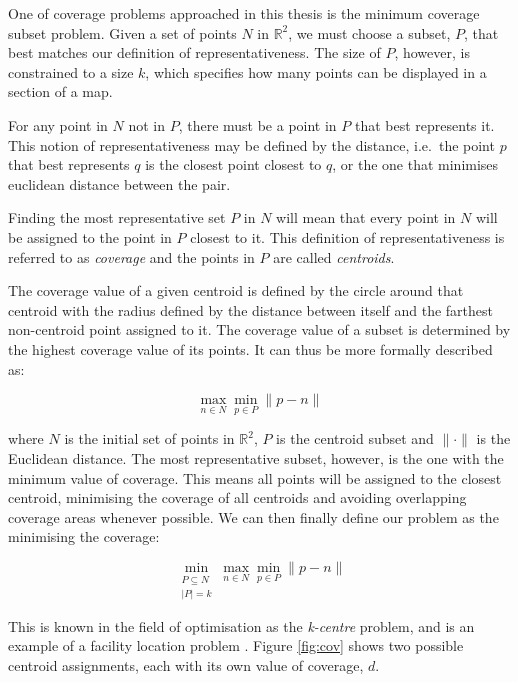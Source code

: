 One of coverage problems approached in this thesis is the minimum coverage subset problem. Given a set of points $N$ in $\mathbb{R}^2$, we must choose a subset, $P$, that best matches our definition of representativeness.
The size of $P$, however, is constrained to a size $k$, which specifies how many points can be displayed in a section of a map.

For any point in $N$ not in $P$, there must be a point in $P$ that best represents it. This notion of representativeness may be defined by the distance, i.e.\ the point $p$ that best represents $q$ is the closest point closest to $q$, or the one that minimises euclidean distance between the pair.

Finding the most representative set $P$ in $N$ will mean that every point in $N$ will be assigned to the point in $P$ closest to it. This definition of representativeness is referred to as \emph{coverage} and the points in $P$ are called \emph{centroids}.

The coverage value of a given centroid is defined by the circle around that centroid with the radius defined by the distance between itself and the farthest non-centroid point assigned to it. The coverage value of a subset is determined by the highest coverage value of its points. It can thus be more formally described as:

\begin{equation}
\max_{n \in N}
	{\min_{p \in P}
		{\lVert p-n \rVert}
	}
\end{equation}

\noindent
where $N$ is the initial set of points in $\mathbb{R}^2$, $P$ is the centroid subset and $\lVert \cdot \rVert $ is the Euclidean distance.
The most representative subset, however, is the one with the minimum value of coverage. This means all points will be assigned to the closest centroid, minimising the coverage of all centroids and avoiding overlapping coverage areas whenever possible.
We can then finally define our problem as the minimising the coverage:

\begin{equation}
\min_{\substack{P \subseteq N\\ \lvert P \rvert = k}}{\max_{n \in N}{\min_{p \in P}{\lVert p-n \rVert}}}
\end{equation}

This is known in the field of optimisation as the \emph{k-centre} problem, and is an example of a facility location problem \cite{thisfref}. Figure \ref{fig:cov} shows two possible centroid assignments, each with its own value of coverage, $d$.

